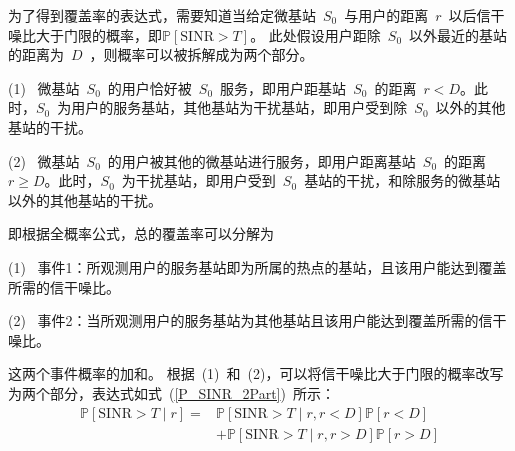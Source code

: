 为了得到覆盖率的表达式，需要知道当给定微基站~$S_0$~与用户的距离~$r$~以后信干噪比大于门限的概率，即$\mathbb{P}[\mathrm{SINR}>T]$。
此处假设用户距除~$S_0$~以外最近的基站的距离为~$D$~，则概率可以被拆解成为两个部分。

(1)~ 微基站~$S_0$~的用户恰好被~$S_0$~服务，即用户距基站~$S_0$~的距离~$r < D$。此时，$S_0$~为用户的服务基站，其他基站为干扰基站，即用户受到除~$S_0$~以外的其他基站的干扰。

(2)~ 微基站~$S_0$~的用户被其他的微基站进行服务，即用户距离基站~$S_0$~的距离~$r \geq D$。此时，$S_0$~为干扰基站，即用户受到~$S_0$~基站的干扰，和除服务的微基站以外的其他基站的干扰。

即根据全概率公式，总的覆盖率可以分解为

(1)~ 事件1：所观测用户的服务基站即为所属的热点的基站，且该用户能达到覆盖所需的信干噪比。

(2)~ 事件2：当所观测用户的服务基站为其他基站且该用户能达到覆盖所需的信干噪比。

这两个事件概率的加和。
根据~(1)~和~(2)，可以将信干噪比大于门限的概率改写为两个部分，表达式如式~(\ref{P_SINR_2Part})~所示：
\begin{equation}\label{P_SINR_2Part}
  \begin{aligned}
  \mathbb{P}[\mathrm{SINR}>T \mid r] =& \mathbb{P}[\mathrm{SINR}>T \mid r, r < D] \mathbb{P}[r<D]\\
                               &+ \mathbb{P}[\mathrm{SINR}>T \mid r, r > D]\mathbb{P}[r>D]
  \end{aligned}
\end{equation}


